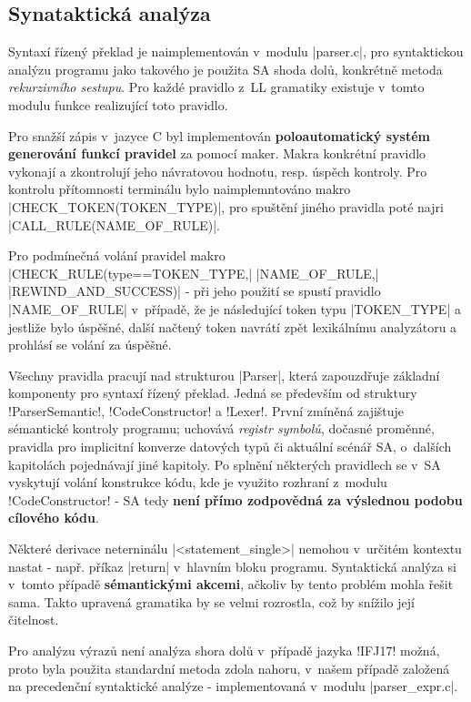 \subsection{Synataktická analýza}
Syntaxí řízený překlad je naimplementován v~modulu \ic|parser.c|, pro syntaktickou analýzu programu jako takového je
použita SA shoda dolů, konkrétně metoda \emph{rekurzivního sestupu}. Pro každé pravidlo z~LL gramatiky existuje v~tomto
modulu funkce realizující toto pravidlo.

Pro snažší zápis v~jazyce C byl implementován \textbf{poloautomatický systém generování funkcí pravidel} za pomocí maker.
Makra konkrétní pravidlo vykonají a zkontrolují jeho návratovou hodnotu, resp. úspěch kontroly. Pro kontrolu přítomnosti terminálu bylo
naimplemntováno makro \ic|CHECK_TOKEN(TOKEN_TYPE)|, pro spuštění jiného pravidla poté najri
\ic|CALL_RULE(NAME_OF_RULE)|.

Pro podmínečná volání pravidel makro
\ic|CHECK_RULE(type==TOKEN_TYPE,| \ic|NAME_OF_RULE,| \ic|REWIND_AND_SUCCESS)| - při jeho použití se spustí pravidlo
\ic|NAME_OF_RULE| v~případě, že je následující token typu \ic|TOKEN_TYPE| a jestliže bylo úspěšné, další načtený
token navrátí zpět lexikálnímu analyzátoru a prohlásí se volání za úspěšné.

Všechny pravidla pracují nad strukturou \ic|Parser|, která zapouzdřuje základní komponenty pro syntaxí řízený překlad.
Jedná se především od struktury \ic!ParserSemantic!, \ic!CodeConstructor! a \ic!Lexer!. První zmíněná zajištuje sémantické
kontroly programu; uchovává \emph{registr symbolů}, dočasné proměnné, pravidla pro implicitní konverze datových typů či
aktuální scénář SA, o~dalších kapitolách pojednávají jiné kapitoly. Po splnění některých pravidlech se v~SA vyskytují volání konstrukce kódu, kde je využito rozhraní z~modulu \ic!CodeConstructor! - SA tedy \textbf{není přímo zodpovědná za výslednou podobu cílového kódu}.

Některé derivace neterninálu \ic|<statement_single>| nemohou v~určitém kontextu nastat
- např. příkaz \ic|return| v~hlavním bloku programu. Syntaktická analýza si v~tomto případě  \textbf{sémantickými akcemi}, ačkoliv by tento problém mohla řešit sama. Takto upravená gramatika by se velmi rozrostla, což by snížilo její čitelnost.

Pro analýzu výrazů není analýza shora dolů v~případě jazyka \ic!IFJ17! možná, proto byla
použita standardní metoda zdola nahoru, v~našem případě založená na precedenční
syntaktické analýze - implementovaná v~modulu \ic|parser_expr.c|.

